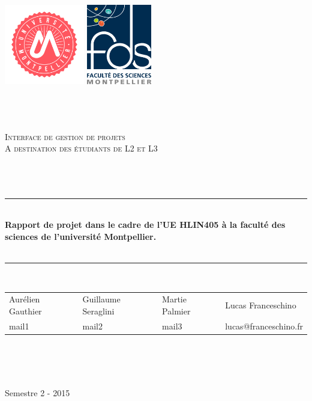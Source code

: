 \begin{titlepage}
\begin{center}

\href{http://www.umontpellier.fr/}{\includegraphics[height=3.5cm]{images/Logo_UM.png}}
\href{http://www.fdsweb.univ-montp2.fr/}{\includegraphics[height=3.5cm]{images/LogoFDS.png}}

~\\~\\~\\

\textsc{\huge Interface de gestion de projets
\\
\normalsize A destination des étudiants de L2 et L3}\\[1.5cm]
~\\~\\~\\

\hrule ~ \\[0.7cm]
{ \large \bfseries 
	Rapport de projet dans le cadre de l'UE HLIN405 à la faculté des sciences de l'université Montpellier.
\\[0.7cm] }~\\

\hrule ~ \\[1.4cm]


\begin{tabularx}{\textwidth}{YYYY}
   Aurélien Gauthier & Guillaume Seraglini & Martie Palmier & Lucas Franceschino\\
   \small mail1 & \small mail2 & \small mail3 & \small lucas@franceschino.fr
\end{tabularx}

~\\~\\~\\

\vfill

{\large Semestre 2 - 2015}

\end{center}
\end{titlepage}